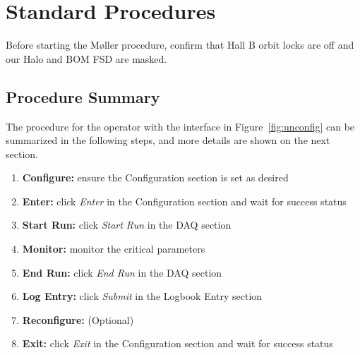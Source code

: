 \documentclass[amsmath,amssymb,notitlepage,12pt]{revtex4}
\begin{document}
\section{Standard Procedures}\label{sec:user}
Before starting the M{\o}ller procedure, confirm that Hall B orbit locks are off and our Halo and BOM FSD are masked.
\subsection{Procedure Summary}
The procedure for the operator with the interface in Figure~\ref{fig:unconfig} can be summarized in the following steps, and more details are shown on the next section.
\begin{enumerate}
\vspace{-4mm}\item {\bf Configure:}  ensure the Configuration section is set as desired
\vspace{-4mm}\item {\bf Enter:} click {\em Enter} in the Configuration section and wait for success status
\vspace{-4mm}\item {\bf Start Run:} click {\em Start Run} in the DAQ section
\vspace{-4mm}\item {\bf Monitor:} monitor the critical parameters
\vspace{-4mm}\item {\bf End Run:} click {\em End Run} in the DAQ section
\vspace{-4mm}\item {\bf Log Entry:} click {\em Submit} in the Logbook Entry section 
\vspace{-4mm}\item {\bf Reconfigure:} (Optional)
\vspace{-4mm}\item {\bf Exit:} click {\em Exit} in the Configuration section and wait for success status
\end{enumerate}
\end{document}
